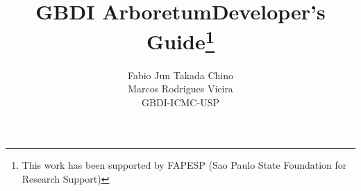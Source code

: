 \documentclass{report}
\newcommand{\libname}[0]{GBDI Arboretum}
\begin{document}
	\title{\libname Developer's Guide\thanks{This work has been supported by FAPESP (Sao Paulo
State Foundation for Research Support)}}
	\author{Fabio Jun Takada Chino\\Marcos Rodrigues Vieira\\GBDI-ICMC-USP}
	\maketitle

	

  \tableofcontents
		
	
	
	
	
	
	
	
	
	

	
	
	
	\appendix
	
	
	
	
\end{document}
